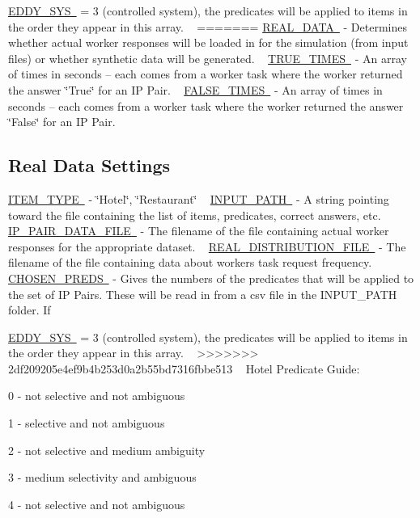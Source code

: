 \mbox{\hyperlink{namespacedynamicfilterapp_1_1toggles_a549d2c90f3f5922ad1442df2113fca1b}{E\+D\+D\+Y\+\_\+\+S\+YS }} = 3 (controlled system), the predicates will be applied to items in the order they appear in this array. ~\newline
=======
\mbox{\hyperlink{}{R\+E\+A\+L\+\_\+\+D\+A\+TA }} -\/ Determines whether actual worker responses will be loaded in for the simulation (from input files) or whether synthetic data will be generated. ~\newline
 \mbox{\hyperlink{}{T\+R\+U\+E\+\_\+\+T\+I\+M\+ES }} -\/ An array of times in seconds -- each comes from a worker task where the worker returned the answer \char`\"{}\+True\char`\"{} for an IP Pair. ~\newline
 \mbox{\hyperlink{}{F\+A\+L\+S\+E\+\_\+\+T\+I\+M\+ES }} -\/ An array of times in seconds -- each comes from a worker task where the worker returned the answer \char`\"{}\+False\char`\"{} for an IP Pair.\hypertarget{toggles_realdata}{}\subsection{Real Data Settings}\label{toggles_realdata}
\mbox{\hyperlink{}{I\+T\+E\+M\+\_\+\+T\+Y\+PE }} -\/ \char`\"{}\+Hotel\char`\"{}, \char`\"{}\+Restaurant\char`\"{} ~\newline
 \mbox{\hyperlink{}{I\+N\+P\+U\+T\+\_\+\+P\+A\+TH }} -\/ A string pointing toward the file containing the list of items, predicates, correct answers, etc.~\newline
 \mbox{\hyperlink{}{I\+P\+\_\+\+P\+A\+I\+R\+\_\+\+D\+A\+T\+A\+\_\+\+F\+I\+LE }} -\/ The filename of the file containing actual worker responses for the appropriate dataset. ~\newline
 \mbox{\hyperlink{}{R\+E\+A\+L\+\_\+\+D\+I\+S\+T\+R\+I\+B\+U\+T\+I\+O\+N\+\_\+\+F\+I\+LE }} -\/ The filename of the file containing data about workers\textquotesingle{} task request frequency. ~\newline
 \mbox{\hyperlink{}{C\+H\+O\+S\+E\+N\+\_\+\+P\+R\+E\+DS }} -\/ Gives the numbers of the predicates that will be applied to the set of IP Pairs. These will be read in from a csv file in the I\+N\+P\+U\+T\+\_\+\+P\+A\+TH folder. If

\mbox{\hyperlink{}{E\+D\+D\+Y\+\_\+\+S\+YS }} = 3 (controlled system), the predicates will be applied to items in the order they appear in this array. ~\newline
>>>>>>> 2df209205e4ef9b4b253d0a2b55bd7316fbbe513
~\newline
Hotel Predicate Guide\+:
\begin{DoxyItemize}
\item 0 -\/ not selective and not ambiguous
\item 1 -\/ selective and not ambiguous
\item 2 -\/ not selective and medium ambiguity
\item 3 -\/ medium selectivity and ambiguous
\item 4 -\/ not selective and not ambiguous
\end{DoxyItemize}

